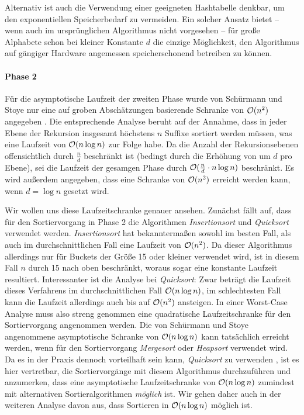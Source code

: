 Alternativ ist auch die Verwendung einer geeigneten Hashtabelle denkbar, um den exponentiellen Speicherbedarf zu vermeiden. Ein solcher Ansatz bietet -- wenn auch im ursprünglichen Algorithmus nicht vorgesehen -- für große Alphabete schon bei kleiner Konstante \(d\) die einzige Möglichkeit, den Algorithmus auf gängiger Hardware angemessen speicherschonend betreiben zu können.
\paragraph*{Phase 2}
Für die asymptotische Laufzeit der zweiten Phase wurde von Schürmann und Stoye nur eine auf groben Abschätzungen basierende Schranke von \(\mathcal{O}(n^2)\) angegeben \cite[Kapitel~3.2]{schuermann2005}. Die entsprechende Analyse beruht auf der Annahme, dass in jeder Ebene der Rekursion insgesamt höchstens \(n\) Suffixe sortiert werden müssen, was eine Laufzeit von \(\mathcal{O}(n \log n)\) zur Folge habe. Da die Anzahl der Rekursionsebenen offensichtlich durch \(\frac n d\) beschränkt ist (bedingt durch die Erhöhung von \offset um \(d\) pro Ebene), sei die Laufzeit der gesamgen Phase durch \(\mathcal{O}(\frac n d \cdot n \log n)\) beschränkt. Es wird außerdem angegeben, dass eine Schranke von \(\mathcal{O}(n^2)\) erreicht werden kann, wenn \(d = \log n\) gesetzt wird.\par\smallskip
Wir wollen uns diese Laufzeitschranke genauer ansehen. Zunächst fällt auf, dass für den Sortiervorgang in Phase 2 die Algorithmen \emph{Insertionsort} und \emph{Quicksort} verwendet werden. \emph{Insertionsort} hat bekanntermaßen sowohl im besten Fall, als auch im durchschnittlichen Fall eine Laufzeit von \(\mathcal{O}(n^2)\). Da dieser Algorithmus allerdings nur für Buckets der Größe 15 oder kleiner verwendet wird, ist in diesem Fall \(n\) durch 15 nach oben beschränkt, woraus sogar eine konstante Laufzeit resultiert. Interessanter ist die Analyse bei \emph{Quicksort}: Zwar beträgt die Laufzeit dieses Verfahrens im durchschnittlichen Fall \(\mathcal{O}(n \log n)\), im schlechtesten Fall kann die Laufzeit allerdings auch bis auf \(\mathcal{O}(n^2)\) ansteigen. In einer Worst-Case Analyse muss also streng genommen eine quadratische Laufzeitschranke für den Sortiervorgang angenommen werden. Die von Schürmann und Stoye angenommene asymptotische Schranke von \(\mathcal{O}(n \log n)\) kann tatsächlich erreicht werden, wenn für den Sortiervorgang \emph{Mergesort} oder \emph{Heapsort} verwendet wird. Da es in der Praxis dennoch vorteilhaft sein kann, \emph{Quicksort} zu verwenden \cite[Tabelle~1]{quicksort}, ist es hier vertretbar, die Sortiervorgänge mit diesem Algorithmus durchzuführen und anzumerken, dass eine asymptotische Laufzeitschranke von \(\mathcal{O}(n \log n)\) zumindest mit alternativen Sortieralgorithmen \emph{möglich} ist. Wir gehen daher auch in der weiteren Analyse davon aus, dass Sortieren in \(\mathcal{O}(n \log n)\) möglich ist.\par
